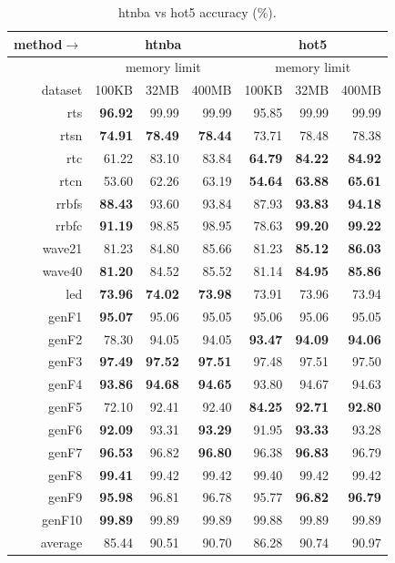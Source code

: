 \begin{table}
\caption{{\sc htnba} vs {\sc hot5} accuracy (\%).}
\label{tab:htnba_vs_hot5}
\centering
\begin{tabular}{|r||r|r|r||r|r|r|}
\hline
method$\rightarrow$ & \multicolumn{3}{|c||}{{\sc htnba}} & \multicolumn{3}{|c|}{{\sc hot5}} \\
\hline
 & \multicolumn{3}{|c||}{memory limit} & \multicolumn{3}{|c|}{memory limit} \\
\hline
dataset & 100KB & 32MB & 400MB & 100KB & 32MB & 400MB \\
\hline
{\sc rts} & \textbf{96.92} & 99.99 & 99.99 & 95.85 & 99.99 & 99.99 \\
{\sc rtsn} & \textbf{74.91} & \textbf{78.49} & \textbf{78.44} & 73.71 & 78.48 & 78.38 \\
{\sc rtc} & 61.22 & 83.10 & 83.84 & \textbf{64.79} & \textbf{84.22} & \textbf{84.92} \\
{\sc rtcn} & 53.60 & 62.26 & 63.19 & \textbf{54.64} & \textbf{63.88} & \textbf{65.61} \\
{\sc rrbfs} & \textbf{88.43} & 93.60 & 93.84 & 87.93 & \textbf{93.83} & \textbf{94.18} \\
{\sc rrbfc} & \textbf{91.19} & 98.85 & 98.95 & 78.63 & \textbf{99.20} & \textbf{99.22} \\
{\sc wave21} & 81.23 & 84.80 & 85.66 & 81.23 & \textbf{85.12} & \textbf{86.03} \\
{\sc wave40} & \textbf{81.20} & 84.52 & 85.52 & 81.14 & \textbf{84.95} & \textbf{85.86} \\
{\sc led} & \textbf{73.96} & \textbf{74.02} & \textbf{73.98} & 73.91 & 73.96 & 73.94 \\
{\sc genF1} & \textbf{95.07} & 95.06 & 95.05 & 95.06 & 95.06 & 95.05 \\
{\sc genF2} & 78.30 & 94.05 & 94.05 & \textbf{93.47} & \textbf{94.09} & \textbf{94.06} \\
{\sc genF3} & \textbf{97.49} & \textbf{97.52} & \textbf{97.51} & 97.48 & 97.51 & 97.50 \\
{\sc genF4} & \textbf{93.86} & \textbf{94.68} & \textbf{94.65} & 93.80 & 94.67 & 94.63 \\
{\sc genF5} & 72.10 & 92.41 & 92.40 & \textbf{84.25} & \textbf{92.71} & \textbf{92.80} \\
{\sc genF6} & \textbf{92.09} & 93.31 & \textbf{93.29} & 91.95 & \textbf{93.33} & 93.28 \\
{\sc genF7} & \textbf{96.53} & 96.82 & \textbf{96.80} & 96.38 & \textbf{96.83} & 96.79 \\
{\sc genF8} & \textbf{99.41} & 99.42 & 99.42 & 99.40 & 99.42 & 99.42 \\
{\sc genF9} & \textbf{95.98} & 96.81 & 96.78 & 95.77 & \textbf{96.82} & \textbf{96.79} \\
{\sc genF10} & \textbf{99.89} & 99.89 & 99.89 & 99.88 & 99.89 & 99.89 \\
\hline
average & 85.44 & 90.51 & 90.70 & 86.28 & 90.74 & 90.97 \\
\hline
\end{tabular}
\end{table}

